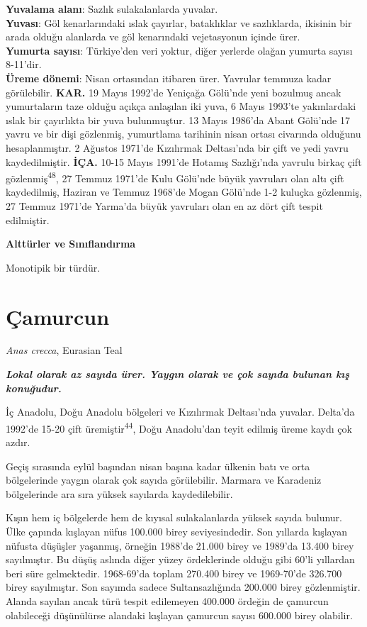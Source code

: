 \documentclass[
  letterpaper,
  DIV=11,
  numbers=noendperiod]{scrreprt}
\begin{document}
\textbf{Yuvalama alanı}: Sazlık sulakalanlarda yuvalar.\\
\textbf{Yuvası}: Göl kenarlarındaki ıslak çayırlar, bataklıklar ve
sazlıklarda, ikisinin bir arada olduğu alanlarda ve göl kenarındaki
vejetasyonun içinde ürer.\\
\textbf{Yumurta sayısı}: Türkiye'den veri yoktur, diğer yerlerde olağan
yumurta sayısı 8-11'dir.\\
\textbf{Üreme dönemi}: Nisan ortasından itibaren ürer. Yavrular temmuza
kadar görülebilir. \textbf{KAR.} 19 Mayıs 1992'de Yeniçağa Gölü'nde yeni
bozulmuş ancak yumurtaların taze olduğu açıkça anlaşılan iki yuva, 6
Mayıs 1993'te yakınlardaki ıslak bir çayırlıkta bir yuva bulunmuştur. 13
Mayıs 1986'da Abant Gölü'nde 17 yavru ve bir dişi gözlenmiş, yumurtlama
tarihinin nisan ortası civarında olduğunu hesaplanmıştır. 2 Ağustos
1971'de Kızılırmak Deltası'nda bir çift ve yedi yavru kaydedilmiştir.
\textbf{İÇA.} 10-15 Mayıs 1991'de Hotamış Sazlığı'nda yavrulu birkaç
çift gözlenmiş\textsuperscript{48}, 27 Temmuz 1971'de Kulu Gölü'nde
büyük yavruları olan altı çift kaydedilmiş, Haziran ve Temmuz 1968'de
Mogan Gölü'nde 1-2 kuluçka gözlenmiş, 27 Temmuz 1971'de Yarma'da büyük
yavruları olan en az dört çift tespit edilmiştir.

\textbf{Alttürler ve Sınıflandırma}

Monotipik bir türdür.

\hypertarget{uxe7amurcun}{%
\section{Çamurcun}\label{uxe7amurcun}}

\emph{Anas crecca}, Eurasian Teal

\textbf{\emph{Lokal olarak az sayıda ürer. Yaygın olarak ve çok sayıda
bulunan kış konuğudur.}}

İç Anadolu, Doğu Anadolu bölgeleri ve Kızılırmak Deltası'nda yuvalar.
Delta'da 1992'de 15-20 çift üremiştir\textsuperscript{44}, Doğu
Anadolu'dan teyit edilmiş üreme kaydı çok azdır.

Geçiş sırasında eylül başından nisan başına kadar ülkenin batı ve orta
bölgelerinde yaygın olarak çok sayıda görülebilir. Marmara ve Karadeniz
bölgelerinde ara sıra yüksek sayılarda kaydedilebilir.

Kışın hem iç bölgelerde hem de kıyısal sulakalanlarda yüksek sayıda
bulunur. Ülke çapında kışlayan nüfus 100.000 birey seviyesindedir. Son
yıllarda kışlayan nüfusta düşüşler yaşanmış, örneğin 1988'de 21.000
birey ve 1989'da 13.400 birey sayılmıştır. Bu düşüş aslında diğer yüzey
ördeklerinde olduğu gibi 60'li yıllardan beri süre gelmektedir.
1968-69'da toplam 270.400 birey ve 1969-70'de 326.700 birey sayılmıştır.
Son sayımda sadece Sultansazlığında 200.000 birey gözlenmiştir. Alanda
sayılan ancak türü tespit edilemeyen 400.000 ördeğin de çamurcun
olabileceği düşünülürse alandaki kışlayan çamurcun sayısı 600.000 birey
olabilir.
\end{document}
